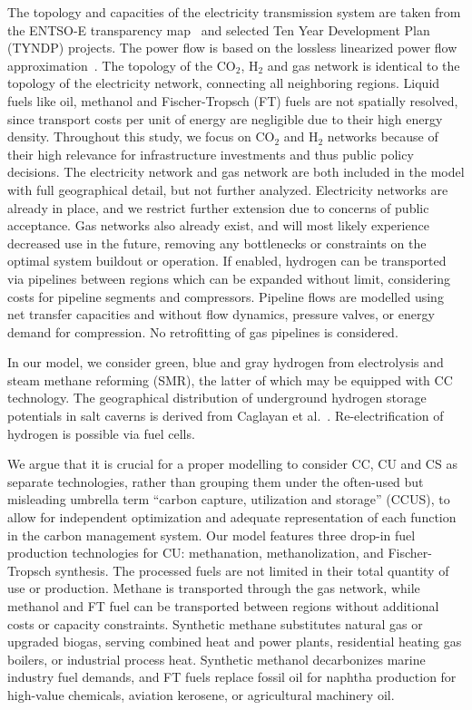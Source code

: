 \documentclass[twocolumn]{article}
\newcommand{\COtwo}{CO$_2$}
\newcommand{\Htwo}{H$_2$}
\begin{document}

The topology and capacities of the electricity transmission system are taken from the ENTSO-E transparency map~\cite{wiegmansGridkitExtractEntsoE2016} and selected Ten Year Development Plan (TYNDP) projects. The power flow is based on the lossless linearized power flow approximation~.
The topology of the \COtwo{}, \Htwo{} and gas network is identical to the topology of the electricity network, connecting all neighboring regions. Liquid fuels like oil, methanol and Fischer-Tropsch (FT) fuels are not spatially resolved, since transport costs per unit of energy are negligible due to their high energy density. Throughout this study, we focus on \COtwo{} and \Htwo{} networks because of their high relevance for infrastructure investments and thus public policy decisions. The electricity network and gas network are both included in the model with full geographical detail, but not further analyzed. Electricity networks are already in place, and we restrict further extension due to concerns of public acceptance. Gas networks also already exist, and will most likely experience decreased use in the future, removing any bottlenecks or constraints on the optimal system buildout or operation.
If enabled, hydrogen can be transported via pipelines between regions which can be expanded without limit, considering costs for pipeline segments and compressors. Pipeline flows are modelled using net transfer capacities and without flow dynamics, pressure valves, or energy demand for compression. No retrofitting of gas pipelines is considered.


In our model, we consider green, blue and gray hydrogen from electrolysis and steam methane reforming (SMR), the latter of which may be equipped with CC technology. The geographical distribution of underground hydrogen storage potentials in salt caverns is derived from Caglayan et al.~\cite{caglayanTechnicalPotentialSalt2020}. Re-electrification of hydrogen is possible via fuel cells.


We argue that it is crucial for a proper modelling to consider CC, CU and CS as separate technologies, rather than grouping them under the often-used but misleading umbrella term ``carbon capture, utilization and storage'' (CCUS), to allow for independent optimization and adequate representation of each function in the carbon management system.
Our model features three drop-in fuel production technologies for CU: methanation, methanolization, and Fischer-Tropsch synthesis.
The processed fuels are not limited in their total quantity of use or production.
Methane is transported through the gas network, while methanol and FT fuel can be transported between regions without additional costs or capacity constraints.
Synthetic methane substitutes natural gas or upgraded biogas, serving combined heat and power plants, residential heating gas boilers, or industrial process heat.
Synthetic methanol decarbonizes marine industry fuel demands, and FT fuels replace fossil oil for naphtha production for high-value chemicals, aviation kerosene, or agricultural machinery oil.
\end{document}
